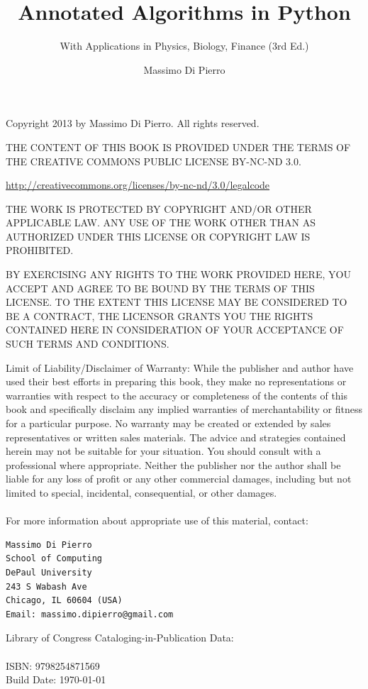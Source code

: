 \documentclass[justified, sixbynine]{tufte-book}
\title{\LARGE Annotated Algorithms in Python}
\subtitle{With Applications in Physics, Biology, Finance (3rd Ed.)}
\author{Massimo Di Pierro}
\theoremstyle{plain}%
\newtheorem * {corollary}{Corollary}
\theoremstyle{definition}
\theoremstyle{remark}
\newtheorem * {remark}{Remark}
\newtheorem * {note}{Note}
\begin{document}
\frontmatter

\maketitle

\thispagestyle{empty}
\setlength{\parindent}{0pt}
\setlength{\parskip}{2mm}
{\footnotesize
\vskip 1in
Copyright 2013 by Massimo Di Pierro. All rights reserved.
\vskip 1cm

THE CONTENT OF THIS BOOK IS PROVIDED UNDER THE TERMS OF THE CREATIVE COMMONS PUBLIC LICENSE BY-NC-ND 3.0.

\url{http://creativecommons.org/licenses/by-nc-nd/3.0/legalcode}

THE WORK IS PROTECTED BY COPYRIGHT AND/OR OTHER APPLICABLE LAW. ANY USE OF THE WORK OTHER THAN AS AUTHORIZED UNDER THIS LICENSE OR COPYRIGHT LAW IS PROHIBITED.

BY EXERCISING ANY RIGHTS TO THE WORK PROVIDED HERE, YOU ACCEPT AND AGREE TO BE BOUND BY THE TERMS OF THIS LICENSE. TO THE EXTENT THIS LICENSE MAY BE CONSIDERED TO BE A CONTRACT, THE LICENSOR GRANTS YOU THE RIGHTS CONTAINED HERE IN CONSIDERATION OF YOUR ACCEPTANCE OF SUCH TERMS AND CONDITIONS.

Limit of Liability/Disclaimer of Warranty: While the publisher and
author have used their best efforts in preparing this book, they
make no representations or warranties with respect to the accuracy
or completeness of the contents of this book and specifically
disclaim any implied warranties of merchantability or fitness for a
particular purpose.  No warranty may be created or extended by
sales representatives or written sales materials.
The advice and strategies contained herein may not be
suitable for your situation. You should consult with a professional
where appropriate.  Neither the publisher nor the author shall be liable
for any loss of profit or any other commercial damages, including
but not limited to special, incidental, consequential, or other damages. \\ \\

For more information about appropriate use of this material, contact:

\begin{verbatim}
Massimo Di Pierro
School of Computing
DePaul University
243 S Wabash Ave
Chicago, IL 60604 (USA)
Email: massimo.dipierro@gmail.com
\end{verbatim}

Library of Congress Cataloging-in-Publication Data: \\ \\
ISBN: 9798254871569 \\
Build Date: \today
}
\end{document}
